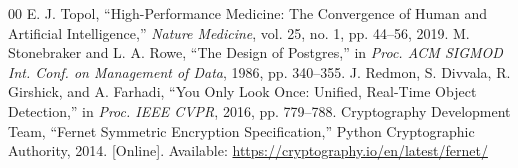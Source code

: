 \documentclass[conference]{IEEEtran}
\begin{document}
\begin{thebibliography}{00}
 E. J. Topol, ``High-Performance Medicine: The Convergence of Human and Artificial Intelligence,'' \textit{Nature Medicine}, vol. 25, no. 1, pp. 44--56, 2019.
 M. Stonebraker and L. A. Rowe, ``The Design of Postgres,'' in \textit{Proc. ACM SIGMOD Int. Conf. on Management of Data}, 1986, pp. 340--355.
 J. Redmon, S. Divvala, R. Girshick, and A. Farhadi, ``You Only Look Once: Unified, Real-Time Object Detection,'' in \textit{Proc. IEEE CVPR}, 2016, pp. 779--788.
 Cryptography Development Team, ``Fernet Symmetric Encryption Specification,'' Python Cryptographic Authority, 2014. [Online]. Available: \url{https://cryptography.io/en/latest/fernet/}
\end{thebibliography}
\end{document}
